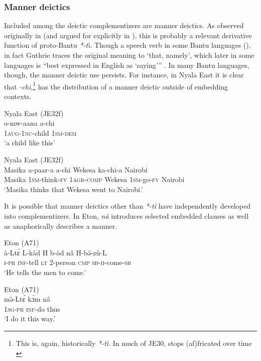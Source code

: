 \documentclass[output=paper,colorlinks,citecolor=brown,
]{langscibook}
\begin{document}
%

\subsubsection{Manner deictics}\label{sec:gluckman:mannercompsection}

Included among the deictic complementizers are manner deictics. As observed originally in \citet[105]{Guthrie:1970} (and argued for explicitly in \citealt{Guldemann:2002, Guldemann:2008}), this is probably a relevant derivative function of proto-Bantu \textit{*-t\`\i}. Though a speech verb in some Bantu languages (), in fact Guthrie traces the original meaning to `that, namely', which later in some languages is ``best expressed in English as `saying'{''} \citep[105]{Guthrie:1970}. In many Bantu languages, though, the manner deictic use persists. For instance, in Nyala East it is clear that \textit{-chi},\footnote{This is, again, historically \textit{*-t\`i}. In much of JE30, stops (af)fricated over time \citep{Guthrie:1970a}} has the distribution of a manner deictic outside of embedding contexts.

\ea
	\begin{xlist}
	\ex Nyala East (JE32f) \\
	\gll o-mw-aana a-chi\\
	1\textsc{aug}-1\textsc{nc}-child 1\textsc{sm}-\textsc{dem}\\
	\glt `a child like this' 
	
	\ex Nyala East (JE32f) \citep{Gluckman:2023} \\
	\gll Masika a-paar-a a-chi Wekesa ka-chi-a Nairobi\\
	Masika 1\textsc{sm}-think-\textsc{fv} 1\textsc{agr}-\textsc{comp} Wekesa 1\textsc{sm}-go-\textsc{fv} Nairobi\\
	\glt `Masika thinks that Wekesa went to Nairobi.' 
	
	\end{xlist}
\z 

It is possible that manner deictics other than \textit{*-t\`i} have independently developed into complementizers. In Eton, \textit{n\^a} introduces selected embedded clauses as well as anaphorically describes a manner.

\ea
	\begin{xlist}
	\ex Eton (A71) \citep[351]{VandeVelde:2008} \\
	\gll \`a-Lt\'ɛ L-k\`ad H b-\`od n\^a H-b\'ə-z\`u-L\\
	\textsc{i-pr} \textsc{inf}-tell \textsc{lt} 2-person \textsc{cmp} \textsc{sb-ii}-come-\textsc{sb}\\
	\glt `He tells the men to come.' 
	
	\ex Eton (A71) \citep[170]{VandeVelde:2008} \\
	\gll m\`ə-Lt\'ɛ k\`ɔm n\^a\\
	1\textsc{sg}-\textsc{pr} \textsc{inf}-do thus\\
	\glt `I do it this way.' 
	\end{xlist}
\z
\end{document}
